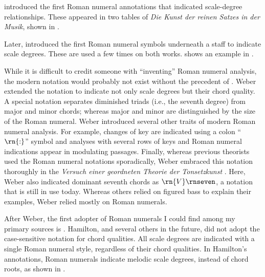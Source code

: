 
\textcite{kirnberger1774kunst} introduced the first Roman
numeral annotations that indicated scale-degree
relationships. These appeared in two tables of \emph{Die
Kunst der reinen Satzes in der Musik}, shown in
.


Later, \textcite{vogler1778grunde, vogler1802handbuch}
introduced the first Roman numeral symbols underneath a
staff to indicate scale degrees. These are used a few times
on both works. 
shows an example in \textcite{vogler1778grunde}.


While it is difficult to credit someone with ``inventing''
Roman numeral analysis, the modern notation would probably
not exist without the precedent of
\textcite{weber1817versuch}. Weber extended the notation to
indicate not only scale degrees but their chord quality. A
special notation separates diminished triads (i.e., the
seventh degree) from major and minor chords; whereas major
and minor are distinguished by the size of the Roman
numeral. Weber introduced several other traits of modern
Roman numeral analysis. For example, changes of key are
indicated using a colon ``$\rn{:}$'' symbol and analyses
with several rows of keys and Roman numeral indications
appear in modulating passages. Finally, whereas previous
theorists used the Roman numeral notations sporadically,
Weber embraced this notation thoroughly in the
\emph{Versuch einer geordneten Theorie der Tonsetzkunst}
\parencite{weber1817versuch}. Here, Weber also indicated
dominant seventh chords as $\rn{V}\rnseven$, a notation that
is still in use today. Whereas others relied on figured bass
to explain their examples, Weber relied mostly on Roman
numerals.


After Weber, the first adopter of Roman numerals I could
find among my primary sources is
\textcite{hamilton1840catechism}. Hamilton, and several
others in the future, did not adopt the case-sensitive
notation for chord qualities. All scale degrees are
indicated with a single Roman numeral style, regardless of
their chord qualities. In Hamilton's annotations, Roman
numerals indicate melodic scale degrees, instead of chord
roots, as shown in
.


